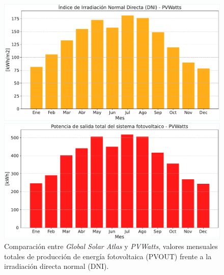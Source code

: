 \begin{figure}[ht!]
    \begin{minipage}{0.47\textwidth}
        \centering
        \includegraphics[width=\linewidth]{fig/06_fault_sg/fault_sg_02c.pdf}
    \end{minipage}
    \hfill
    \begin{minipage}{0.47\textwidth}
        \centering
        \includegraphics[width=\linewidth]{fig/06_fault_sg/fault_sg_02d.pdf}
    \end{minipage}
    
    \caption{Comparación entre \textit{Global Solar Atlas} y \textit{PVWatts}, valores mensuales totales de producción de energía fotovoltaica (PVOUT) frente a la irradiación directa normal (DNI).}
    \label{fig:DNIpvoutVS}
\end{figure}

